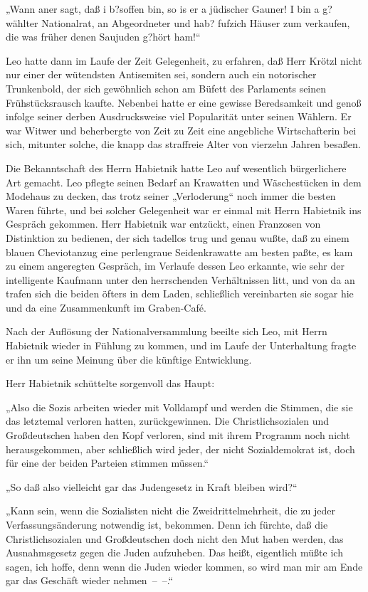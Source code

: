„Wann aner sagt, daß i b?soffen bin, so is er a jüdischer Gauner! I
bin a g?wählter Nationalrat, an Abgeordneter und hab? fufzich
Häuser zum verkaufen, die was früher denen Saujuden g?hört ham!“

Leo hatte dann im Laufe der Zeit Gelegenheit, zu erfahren, daß Herr
Krötzl nicht nur einer der wütendsten Antisemiten sei, sondern auch
ein notorischer Trunkenbold, der sich gewöhnlich schon am Büfett
des Parlaments seinen Frühstücksrausch kaufte. Nebenbei hatte er
eine gewisse Beredsamkeit und genoß infolge seiner derben
Ausdrucksweise viel Popularität unter seinen Wählern. Er war Witwer
und beherbergte von Zeit zu Zeit eine angebliche Wirtschafterin bei
sich, mitunter solche, die knapp das straffreie Alter von vierzehn
Jahren besaßen.

Die Bekanntschaft des Herrn Habietnik hatte Leo auf wesentlich
bürgerlichere Art gemacht. Leo pflegte seinen Bedarf an Krawatten
und Wäschestücken in dem Modehaus zu decken, das trotz seiner
„Verloderung“ noch immer die besten Waren führte, und bei solcher
Gelegenheit war er  einmal mit Herrn Habietnik ins
Gespräch gekommen. Herr Habietnik war entzückt, einen Franzosen von
Distinktion zu bedienen, der sich tadellos trug und genau wußte,
daß zu einem blauen Cheviotanzug eine perlengraue Seidenkrawatte am
besten paßte, es kam zu einem angeregten Gespräch, im Verlaufe
dessen Leo erkannte, wie sehr der intelligente Kaufmann unter den
herrschenden Verhältnissen litt, und von da an trafen sich die
beiden öfters in dem Laden, schließlich vereinbarten sie sogar hie
und da eine Zusammenkunft im Graben-Café.

Nach der Auflösung der Nationalversammlung beeilte sich Leo, mit
Herrn Habietnik wieder in Fühlung zu kommen, und im Laufe der
Unterhaltung fragte er ihn um seine Meinung über die künftige
Entwicklung.

Herr Habietnik schüttelte sorgenvoll das Haupt:

„Also die Sozis arbeiten wieder mit Volldampf und werden die
Stimmen, die sie das letztemal verloren hatten, zurückgewinnen. Die
Christlichsozialen und Großdeutschen haben den Kopf verloren, sind
mit ihrem Programm noch nicht herausgekommen, aber schließlich wird
jeder, der nicht Sozialdemokrat ist, doch für eine der beiden
Parteien stimmen müssen.“

„So daß also vielleicht gar das Judengesetz in Kraft bleiben
wird?“

„Kann sein, wenn die Sozialisten nicht die Zweidrittelmehrheit, die
zu jeder Verfassungsänderung notwendig ist, bekommen. Denn ich
fürchte, daß die Christlichsozialen und Großdeutschen doch nicht
den Mut haben werden, das Ausnahmsgesetz gegen die Juden
aufzuheben. Das heißt,  eigentlich müßte ich sagen,
ich hoffe, denn wenn die Juden wieder kommen, so wird man mir am
Ende gar das Geschäft wieder nehmen~–~–.“


